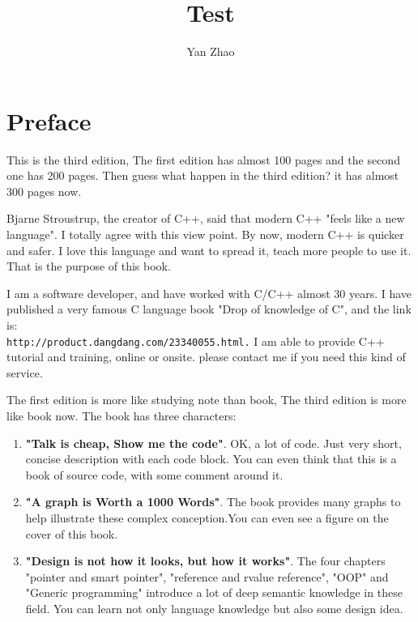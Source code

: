 \documentclass[a4paper,11pt,twoside]{book}
\begin{document}
\title{Test}
\author{Yan Zhao}
\date{}\maketitle

\setcounter{secnumdepth}{4}
\setcounter{tocdepth}{4}
\tableofcontents
\chapter*{Preface}
This is the third edition, The first edition has almost 100 pages and the second one has 200 pages. Then guess what happen in the third edition? it has almost 300 pages now. \par \medskip

Bjarne Stroustrup, the creator of C++, said that modern C++  "feels like a new language". I totally agree with this view point. By now, modern C++ is quicker and safer. I love this language and want to spread it, teach more people to use it. That is the purpose of this book.  \par \medskip

I am a software developer, and have worked with C/C++ almost 30 years. I have published a very famous C language book "Drop of knowledge of C", and the link is:\\ \verb|http://product.dangdang.com/23340055.html.| I am able to provide C++ tutorial and training, online or onsite. please contact me if you need this kind of service.\par \par \medskip


The first edition is more like studying note than book, The third edition is more like book now. The book has three characters:
\begin{enumerate}
	\item \textbf{"Talk is cheap, Show me the code"}. OK, a lot of code. Just very short, concise description with each code block. You can even think that this is a book of source code, with some comment around it.
	
	\item \textbf{"A graph is Worth a 1000 Words"}. The book provides many graphs to help illustrate these complex conception.You can even see a figure on the cover of this book.
	
	\item \textbf{"Design is not how it looks, but how it works"}. The four chapters "pointer and smart pointer", "reference and rvalue reference", "OOP" and "Generic programming" introduce a lot of deep semantic knowledge in these field. You can learn not only language knowledge but also some design idea.
\end{enumerate}
\end{document}
